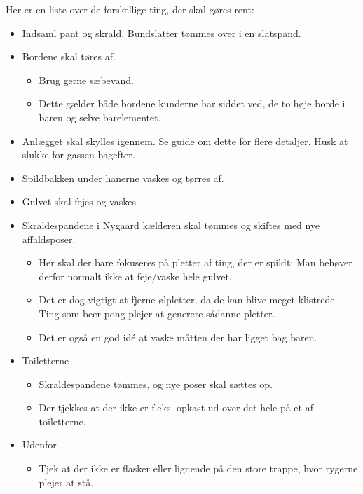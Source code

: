 Her er en liste over de forskellige ting, der skal gøres rent:
\begin{itemize}
	\item Indsaml pant og skrald. Bundslatter tømmes over i en slatspand.
	\item Bordene skal tøres af.
	\begin{itemize}
		\item Brug gerne sæbevand.
		\item Dette gælder både bordene kunderne har siddet ved, de to høje
			borde i baren og selve barelementet.
	\end{itemize}
	\item Anlægget skal skylles igennem. Se guide om dette for flere
	detaljer. Husk at slukke for gassen bagefter.
	\item Spildbakken under hanerne vaskes og tørres af.
	\item Gulvet skal fejes og vaskes
	\item Skraldespandene i Nygaard kælderen skal tømmes og skiftes med nye affaldsposer.
	\begin{itemize}
		\item Her skal der bare fokuseres på pletter af ting, der er spildt:
			Man behøver derfor normalt ikke at feje/vaske hele gulvet.
		\item Det er dog vigtigt at fjerne ølpletter, da de kan blive meget
			klistrede. Ting som beer pong plejer at generere sådanne pletter.
		\item Det er også en god idé at vaske måtten der har ligget bag baren.
	\end{itemize}
	\item Toiletterne
	\begin{itemize}
		\item Skraldespandene tømmes, og nye poser skal sættes op.
		\item Der tjekkes at der ikke er f.eks. opkast ud over det hele på
			et af toiletterne.
	\end{itemize}
	\item Udenfor
	\begin{itemize}
		\item Tjek at der ikke er flasker eller lignende på den store trappe,
			hvor rygerne plejer at stå.
	\end{itemize}
\end{itemize}
